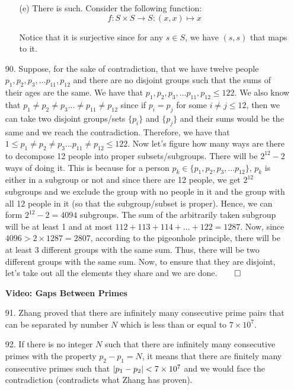 \documentclass[12pt, a4paper]{article}
\DeclarePairedDelimiter\abs{\lvert}{\rvert}
\newcommand{\rarr}{\rightarrow}
\begin{document}
\begin{itemize}
\begin{itemize}
\item[(e)]
There is such. Consider the following function:
$$f : S \times S \rarr S : (x, x) \mapsto x$$

Notice that it is surjective since for any $s \in S$, we have
$(s, s)$ that maps to it.
\end{itemize}

\newpage

\item[90.]
Suppose, for the sake of contradiction, that we have twelve people $p_1, p_2, p_3, ... p_{11}, p_{12}$ and
there are no disjoint groups such that the sums of their ages are the same. 
We have that $p_1, p_2, p_3, ... p_{11}, p_{12} \leq 122$. We also know that
$p_1 \neq p_2 \neq p_3 ... \neq p_{11} \neq p_{12}$ since if $p_i = p_j$ for some $i \neq j \leq 12$,
then we can take two disjoint groups/sets $\{p_i\}$ and $\{p_j\}$ and their sums would be the same and we reach the contradiction.
Therefore, we have that $1 \leq p_1 \neq p_2 \neq p_3 ... p_{11} \neq p_{12} \leq 122$. Now let's figure
how many ways are there to decompose 12 people into proper subsets/subgroups. There will be $2^{12} - 2$ ways of doing it.
This is because for a person $p_k \in \{p_1, p_2, p_3, ... p_12\}$, $p_k$ is either in a subgroup or not and since there are 12 people,
we get $2^{12}$ subgroups and we exclude the group with no people in it and the group with all 12 people in it (so that the subgroup/subset is proper).
Hence, we can form $2^{12} - 2 = 4094$ subgroups. The sum of the arbitrarily taken subgroup will be at least 1 and at most $112 + 113 + 114 + ... + 122 = 1287$.
Now, since $4096 > 2 \times 1287 = 2807$, according to the pigeonhole principle, there will be at least 3 different groups with the same sum. Thus, there will be
two different groups with the same sum. Now, to ensure that they are disjoint, let's take out all the elements they share and we are done.$\qed$


\item[]
\item[]

{\Large \textbf{Video: Gaps Between Primes}}

\item[91.]
Zhang proved that there are infinitely many consecutive prime pairs that can be separated by number $N$ which is less than or equal to $7 \times 10^7$.

\item[92.]
If there is no integer $N$ such that there are infinitely many consecutive primes with the property $p_2 - p_1 = N$,
it means that there are finitely many consecutive primes such that $\abs{p_1 - p_2} < 7 \times 10^7$ and
we would face the contradiction (contradicts what Zhang has proven).


\end{itemize}
\end{document}
